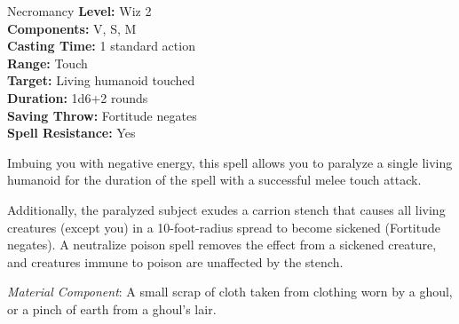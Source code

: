 {Necromancy}
{
	\textbf{Level:}
	Wiz 2\\
	\textbf{Components:}
	V, S, M\\
	\textbf{Casting Time:}
	1 standard action\\
	\textbf{Range:}
	Touch\\
	\textbf{Target:}
	Living humanoid touched\\
	\textbf{Duration:}
	1d6+2 rounds\\
	\textbf{Saving Throw:}
	Fortitude negates\\
	\textbf{Spell Resistance:}
	Yes\\
}
{
	Imbuing you with negative energy, this spell allows you to paralyze a single living humanoid for the duration of the spell with a successful melee touch attack.

	Additionally, the paralyzed subject exudes a carrion stench that causes all living creatures (except you) in a 10-foot-radius spread to become sickened (Fortitude negates). A neutralize poison spell removes the effect from a sickened creature, and creatures immune to poison are unaffected by the stench.

	\textit{Material Component}:
	A small scrap of cloth taken from clothing worn by a ghoul, or a pinch of earth from a ghoul's lair.

}
